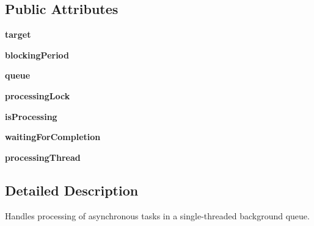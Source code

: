 \subsection*{Public Attributes}
\begin{DoxyCompactItemize}
\item 
{\bfseries target}\hypertarget{classChronos_1_1Processor_1_1BackgroundQueueProcessor_a86442e7d5beb51c3ec2d4aff40e2be82}{}\label{classChronos_1_1Processor_1_1BackgroundQueueProcessor_a86442e7d5beb51c3ec2d4aff40e2be82}

\item 
{\bfseries blocking\+Period}\hypertarget{classChronos_1_1Processor_1_1BackgroundQueueProcessor_a010022d015b389f23de2427a90b7059f}{}\label{classChronos_1_1Processor_1_1BackgroundQueueProcessor_a010022d015b389f23de2427a90b7059f}

\item 
{\bfseries queue}\hypertarget{classChronos_1_1Processor_1_1BackgroundQueueProcessor_ad612a056973047dc57884d455306a225}{}\label{classChronos_1_1Processor_1_1BackgroundQueueProcessor_ad612a056973047dc57884d455306a225}

\item 
{\bfseries processing\+Lock}\hypertarget{classChronos_1_1Processor_1_1BackgroundQueueProcessor_a5deb14a6bc61eab2c938f0d0ed1042f4}{}\label{classChronos_1_1Processor_1_1BackgroundQueueProcessor_a5deb14a6bc61eab2c938f0d0ed1042f4}

\item 
{\bfseries is\+Processing}\hypertarget{classChronos_1_1Processor_1_1BackgroundQueueProcessor_a5cc9163d257d13230e1304df15a9d8e8}{}\label{classChronos_1_1Processor_1_1BackgroundQueueProcessor_a5cc9163d257d13230e1304df15a9d8e8}

\item 
{\bfseries waiting\+For\+Completion}\hypertarget{classChronos_1_1Processor_1_1BackgroundQueueProcessor_ad59f4bbb93dba3da8ddec5664cac8e26}{}\label{classChronos_1_1Processor_1_1BackgroundQueueProcessor_ad59f4bbb93dba3da8ddec5664cac8e26}

\item 
{\bfseries processing\+Thread}\hypertarget{classChronos_1_1Processor_1_1BackgroundQueueProcessor_a19df8b35d65094d36df28e580977ac7f}{}\label{classChronos_1_1Processor_1_1BackgroundQueueProcessor_a19df8b35d65094d36df28e580977ac7f}

\end{DoxyCompactItemize}


\subsection{Detailed Description}
Handles processing of asynchronous tasks in a single-\/threaded background queue. 

